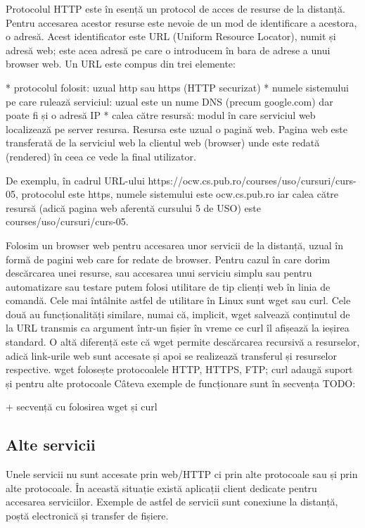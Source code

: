 Protocolul HTTP este în esență un protocol de acces de resurse de la distanță. Pentru accesarea acestor resurse este nevoie de un mod de identificare a acestora, o adresă. Acest identificator este URL (Uniform Resource Locator), numit și adresă web; este acea adresă pe care o introducem în bara de adrese a unui browser web. Un URL este compus din trei elemente:

* protocolul folosit: uzual http sau https (HTTP securizat)
* numele sistemului pe care rulează serviciul: uzual este un nume DNS (precum google.com) dar poate fi și o adresă IP
* calea către resursă: modul în care serviciul web localizează pe server resursa. Resursa este uzual o pagină web. Pagina web este transferată de la serviciul web la clientul web (browser) unde este redată (rendered) în ceea ce vede la final utilizator.

De exemplu, în cadrul URL-ului https://ocw.cs.pub.ro/courses/uso/cursuri/curs-05, protocolul este https, numele sistemului este ocw.cs.pub.ro iar calea către resursă (adică pagina web aferentă cursului 5 de USO) este courses/uso/cursuri/curs-05.

Folosim un browser web pentru accesarea unor servicii de la distanță, uzual în formă de pagini web care for redate de browser. Pentru cazul în care dorim descărcarea unei resurse, sau accesarea unui serviciu simplu sau pentru automatizare sau testare putem folosi utilitare de tip clienți web în linia de comandă. Cele mai întâlnite astfel de utilitare în Linux sunt wget sau curl. Cele două au funcționalități similare, numai că, implicit, wget salvează conținutul de la URL transmis ca argument într-un fișier în vreme ce curl îl afișează la ieșirea standard. O altă diferență este că wget permite descărcarea recursivă a resurselor, adică link-urile web sunt accesate și apoi se realizează transferul și resurselor respective. wget folosește protocoalele HTTP, HTTPS, FTP; curl adaugă suport și pentru alte protocoale Câteva exemple de funcționare sunt în secvența TODO:

+ secvență cu folosirea wget și curl

\subsection{Alte servicii}
\label{sec:net:services}

Unele servicii nu sunt accesate prin web/HTTP ci prin alte protocoale sau și prin alte protocoale. În această situație există aplicații client dedicate pentru accesarea serviciilor. Exemple de astfel de servicii sunt conexiune la distanță, poștă electronică și transfer de fișiere.

